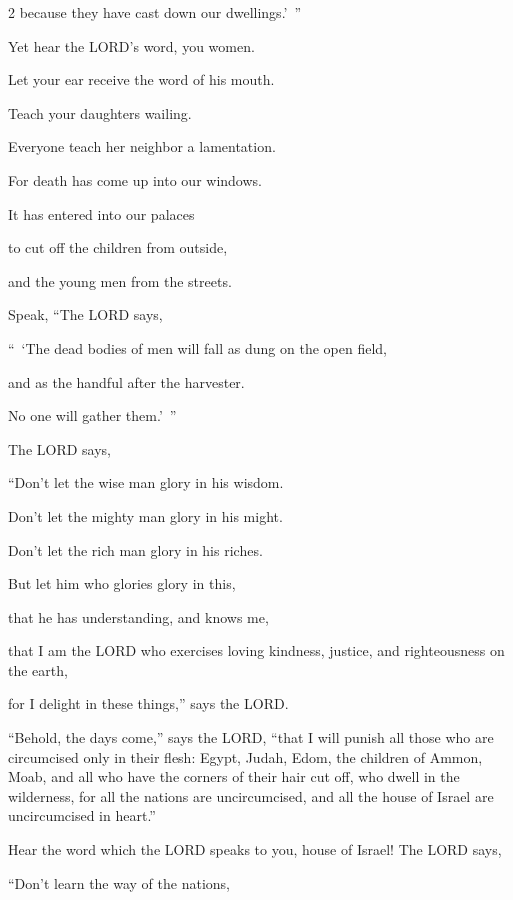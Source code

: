 \begin{multicols}{2}
	because they have cast down our dwellings.’ ”
	
	
	
	\vspace{\baselineskip}
	
	\myverse{}Yet hear the LORD’s word, you women.
	
	Let your ear receive the word of his mouth.
	
	Teach your daughters wailing.
	
	Everyone teach her neighbor a lamentation.
	
	
	\myverse{}For death has come up into our windows.
	
	It has entered into our palaces
	
	to cut off the children from outside,
	
	and the young men from the streets.
	
	
	\myverse{}Speak, “The LORD says,
	
	“ ‘The dead bodies of men will fall as dung on the open field,
	
	and as the handful after the harvester.
	
	No one will gather them.’ ”
	
	
	\myverse{}The LORD says,
	
	
	“Don’t let the wise man glory in his wisdom.
	
	Don’t let the mighty man glory in his might.
	
	Don’t let the rich man glory in his riches.
	
	
	\myverse{}But let him who glories glory in this,
	
	that he has understanding, and knows me,
	
	that I am the LORD who exercises loving kindness, justice, and righteousness on the earth,
	
	for I delight in these things,” says the LORD.
	
	
	
	\myverse{}“Behold, the days come,” says the LORD, “that I will punish all those who are circumcised only in their flesh: \myverse{}Egypt, Judah, Edom, the children of Ammon, Moab, and all who have the corners of their hair cut off, who dwell in the wilderness, for all the nations are uncircumcised, and all the house of Israel are uncircumcised in heart.”
	
	\mychapter{}\myverse*{}Hear the word which the LORD speaks to you, house of Israel! \myverse{}The LORD says,
	
	
	“Don’t learn the way of the nations,
	

\end{multicols}
